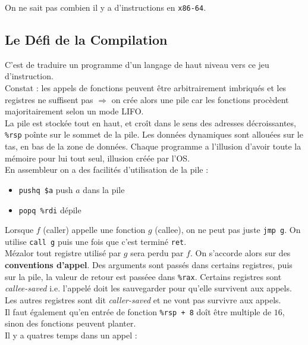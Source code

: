 \documentclass{cours}
\begin{document}
On ne sait pas combien il y a d'instructions en \texttt{x86-64}.

\subsection{Le Défi de la Compilation}
C'est de traduire un programme d'un langage de haut niveau vers ce jeu d'instruction.\\
Constat : les appels de fonctions peuvent être arbitrairement imbriqués et les registres ne suffisent pas $\Rightarrow$ on crée alors une pile car les fonctions procèdent majoritairement selon un mode LIFO.\\
La pile est stockée tout en haut, et croît dans le sens des adresses décroissantes, \texttt{\%rsp} poînte sur le sommet de la pile. Les données dynamiques sont allouées sur le tas, en bas de la zone de données. Chaque programme a l'illusion d'avoir toute la mémoire pour lui tout seul, illusion créée par l'OS. \\
En assembleur on a des facilités d'utilisation de la pile : 
\begin{itemize}
    \item \texttt{pushq \$a} push $a$ dans la pile
    \item \texttt{popq \%rdi} dépile
\end{itemize}
Lorsque $f$ (caller) appelle une fonction $g$ (callee), on ne peut pas juste \texttt{jmp g}. On utilise \texttt{call g} puis une fois que c'est terminé \texttt{ret}.\\
Mézalor tout registre utilisé par $g$ sera perdu par $f$. On s'accorde alors sur des \textbf{conventions d'appel}. Des arguments sont passés dans certains registres, puis sur la pile, la valeur de retour est passéee dans \texttt{\%rax}. 
Certains registres sont \textit{callee-saved} i.e. l'appelé doit les sauvegarder pour qu'elle survivent aux appels. Les autres registres sont dit \textit{caller-saved} et ne vont pas survivre aux appels. \\
Il faut également qu'en entrée de fonction \texttt{\%rsp + 8} doît être multiple de $16$, sinon des fonctions peuvent planter. \\
Il y a quatres temps dans un appel : 
\end{document}
